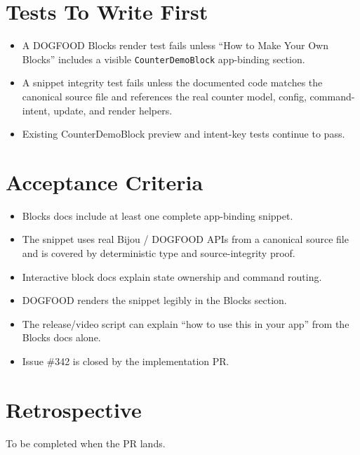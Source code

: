 \section{Tests To Write First}\label{record-143-tests-to-write-first}

\begin{itemize}
\tightlist
\item
  A DOGFOOD Blocks render test fails unless ``How to Make Your Own Blocks'' includes a visible \texttt{C\allowbreak{}o\allowbreak{}u\allowbreak{}n\allowbreak{}t\allowbreak{}e\allowbreak{}r\allowbreak{}D\allowbreak{}e\allowbreak{}m\allowbreak{}o\allowbreak{}B\allowbreak{}l\allowbreak{}o\allowbreak{}c\allowbreak{}k} app-binding section.
\item
  A snippet integrity test fails unless the documented code matches the canonical source file and references the real counter model, config, command-intent, update, and render helpers.
\item
  Existing CounterDemoBlock preview and intent-key tests continue to pass.
\end{itemize}

\section{Acceptance Criteria}\label{record-143-acceptance-criteria}

\begin{itemize}
\tightlist
\item
  Blocks docs include at least one complete app-binding snippet.
\item
  The snippet uses real Bijou / DOGFOOD APIs from a canonical source file and is covered by deterministic type and source-integrity proof.
\item
  Interactive block docs explain state ownership and command routing.
\item
  DOGFOOD renders the snippet legibly in the Blocks section.
\item
  The release/video script can explain ``how to use this in your app'' from the Blocks docs alone.
\item
  Issue \#342 is closed by the implementation PR.
\end{itemize}

\section{Retrospective}\label{record-143-retrospective}

To be completed when the PR lands.


